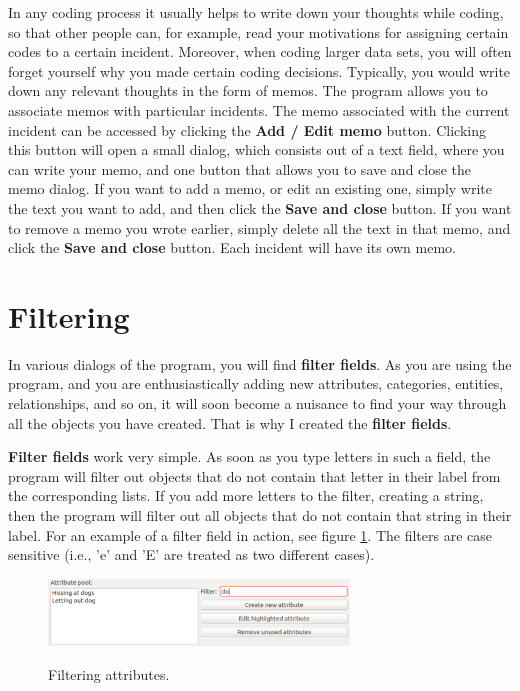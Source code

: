\documentclass{memoir}
\begin{document}
In any coding process it usually helps to write down your thoughts while coding, so that other people can, for example, read your motivations for assigning certain codes to a certain incident. Moreover, when coding larger data sets, you will often forget yourself why you made certain coding decisions. Typically, you would write down any relevant thoughts in the form of memos. The program allows you to associate memos with particular incidents. The memo associated with the current incident can be accessed by clicking the \textbf{Add / Edit memo} button. Clicking this button will open a small dialog, which consists out of a text field, where you can write your memo, and one button that allows you to save and close the memo dialog. If you want to add a memo, or edit an existing one, simply write the text you want to add, and then click the \textbf{Save and close} button. If you want to remove a memo you wrote earlier, simply delete all the text in that memo, and click the \textbf{Save and close} button. Each incident will have its own memo.

\section{Filtering}
\label{sec:filtering}

In various dialogs of the program, you will find \textbf{filter fields}. As you are using the program, and you are enthusiastically adding new attributes, categories, entities, relationships, and so on, it will soon become a nuisance to find your way through all the objects you have created. That is why I created the \textbf{filter fields}.

\textbf{Filter fields} work very simple. As soon as you type letters in such a field, the program will filter out objects that do not contain that letter in their label from the corresponding lists. If you add more letters to the filter, creating a string, then the program will filter out all objects that do not contain that string in their label. For an example of a filter field in action, see figure \ref{fig:filteringattributes}. The filters are case sensitive (i.e., 'e' and 'E' are treated as two different cases). 

\begin{figure}[h!]
  \centering
  \caption{Filtering attributes.}
  \includegraphics[width=80mm]{Screenshot_10.pdf}
  \label{fig:filteringattributes}
\end{figure}
\end{document}
